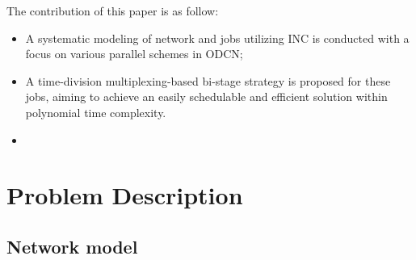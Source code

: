 \documentclass[conference]{IEEEtran}
\begin{document}
The contribution of this paper is as follow:

\begin{itemize}
	
	\item A systematic modeling of network and jobs utilizing INC is conducted with a focus on various parallel schemes in ODCN;
	
	
	\item A time-division multiplexing-based bi-stage strategy is proposed for these jobs, aiming to achieve an easily schedulable and efficient solution within polynomial time complexity.
	
	
	\item
\end{itemize}
\section{Problem Description}

\subsection{Network model}

\end{document}
